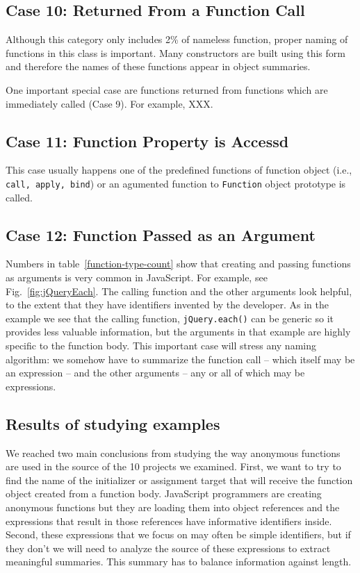 \documentclass[10pt, preprint]{sigplanconf}
\begin{document}
{\subsection{Case 10: Returned From a Function Call}
Although this category only includes 2\% of nameless function, proper naming of functions in this class is important. Many constructors are built using this form and therefore the names of these functions appear in object summaries.

One important special case are functions returned from functions which are immediately called (Case 9).  For example, XXX. 


\subsection{Case 11: Function Property is Accessd}
This case usually happens one of the predefined functions of function object (i.e., {\small\texttt{call, apply, bind}}) or an agumented function to {\small\texttt{Function}} object prototype is called.


\subsection{Case 12: Function Passed as an Argument}
Numbers in table~\ref{function-type-count} show that creating and passing functions as arguments is very common in JavaScript.
For example, see Fig.~\ref{fig:jQueryEach}. The calling function and the other arguments look helpful, to the extent that they have identifiers invented by the developer. As in the example we see that the calling function, \verb|jQuery.each()| can be generic so it provides less valuable information, but the arguments in that example are highly specific to the function body. This important case will stress any naming algorithm: we somehow have to summarize the function call -- which itself may be an expression -- and the other arguments -- any or all of which may be expressions. 

\subsection{Results of studying examples}
We reached two main conclusions from studying the way anonymous functions are used in the source of the 10 projects we examined. First, we want to try to find the name of the initializer or assignment target that will receive the function object created from a function body.  JavaScript programmers are creating anonymous functions but they are loading them into object references and the expressions that result in those references have informative identifiers inside. Second, these expressions that we focus on may often be simple identifiers, but if they don't we will need to analyze the source of these expressions to extract meaningful summaries. This summary has to balance information against length.

}
\end{document}
